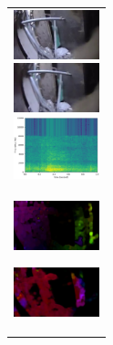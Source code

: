 \begin{figure}[htbp]
\begin{tabular}{l}
\begin{minipage}{0.165\hsize}
\begin{center}
          \includegraphics[clip, width=2.5cm]{./Figures/still_bark4.eps}
        \end{center}
      \end{minipage}
      \begin{minipage}{0.165\hsize}
        \begin{center}
          \includegraphics[clip, width=2.5cm]{./Figures/still_bark5.eps}
        \end{center}
      \end{minipage}
      \begin{minipage}{0.165\hsize}
        \begin{center}
          \includegraphics[clip, width=2.5cm]{./Figures/sound_bark.eps}
        \end{center}
      \end{minipage}
\\  %
      \begin{minipage}{0.165\hsize}
        \begin{center}
          \includegraphics[clip, width=2.5cm]{./Figures/optic_bark1.eps}
          \hspace{0.3cm} { }
        \end{center}
      \end{minipage}
      \begin{minipage}{0.165\hsize}
        \begin{center}
          \includegraphics[clip, width=2.5cm]{./Figures/optic_bark2.eps}
          \hspace{0.0cm} { }

\end{center}
\end{minipage}
\end{tabular}
\end{figure}
